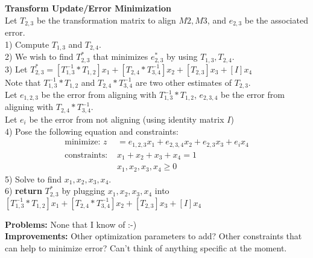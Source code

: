 \documentclass{article}
\begin{document}
	\begin{algorithm}
	\DontPrintSemicolon
	\textbf{Transform Update/Error Minimization}\\
	Let $T_{2,3}$ be the transformation matrix to align $M2, M3$, and $e_{2,3}$ be the associated error.\\
	1) Compute $T_{1,3}$ and $T_{2,4}$.\\
	2) We wish to find $T_{2,3}^{*}$ that minimizes $e_{2,3}^{*}$ by using $T_{1,3},T_{2,4}$.\\
	3) Let $T_{2,3}^{*} = [T_{1,3}^{-1}*T_{1,2}]x_1 + [T_{2,4}*T_{3,4}^{-1}]x_2 + [T_{2,3}]x_3 + [I]x_4$\\
	Note that $T_{1,3}^{-1}*T_{1,2}$ and $T_{2,4}*T_{3,4}^{-1}$ are two other estimates of $T_{2,3}$.\\
	Let $e_{1,2,3}$ be the error from aligning with $T_{1,3}^{-1}*T_{1,2}$, $e_{2,3,4}$ be the error from aligning with $T_{2,4}*T_{3,4}^{-1}$.\\
	Let $e_i$ be the error from not aligning (using identity matrix $I$) \\
 	4) Pose the following equation and constraints:
	\begin{align*}
	 \text{minimize: } z &= e_{1,2,3}x_1 +  e_{2,3,4}x_2 + e_{2,3}x_3 + e_ix_4\\
	 \text{constraints: }&x_1 + x_2 + x_3 + x_4 = 1\\
	 &x_1, x_2, x_3, x_4 \ge 0
	\end{align*}
	5) Solve to find $x_1, x_2, x_3, x_4$.\\
	6) \textbf{return} $T_{2,3}^{*}$ by plugging $x_1, x_2, x_3, x_4$ into $[T_{1,3}^{-1}*T_{1,2}]x_1 + [T_{2,4}*T_{3,4}^{-1}]x_2 + [T_{2,3}]x_3 + [I]x_4$
	\end{algorithm}	

\textbf{Problems:} None that I know of :-)\\
\textbf{Improvements:} Other optimization parameters to add? Other constraints that can help to minimize error? Can't think of anything specific at the moment.
\end{document}
